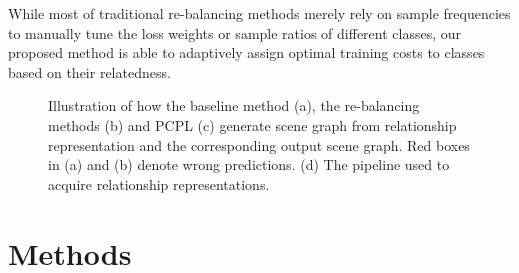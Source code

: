 \documentclass[sigconf]{acmart}
\begin{document}
While most of traditional re-balancing methods merely rely on sample frequencies to manually tune the loss weights or sample ratios of different classes, our proposed method is able to adaptively assign optimal training costs to classes based on their relatedness.
\begin{figure*}[htbp]
\centering
{}

\quad
{}\centering
\caption{Illustration of how the baseline method (a), the re-balancing methods (b) and PCPL (c) generate scene graph from relationship representation and the corresponding output scene graph. Red boxes in (a) and (b) denote wrong predictions. (d) The pipeline used to acquire relationship representations. }
\vspace{-0.2cm}
\label{fig:overall_framework}
\end{figure*}
\section{Methods}
\end{document}
